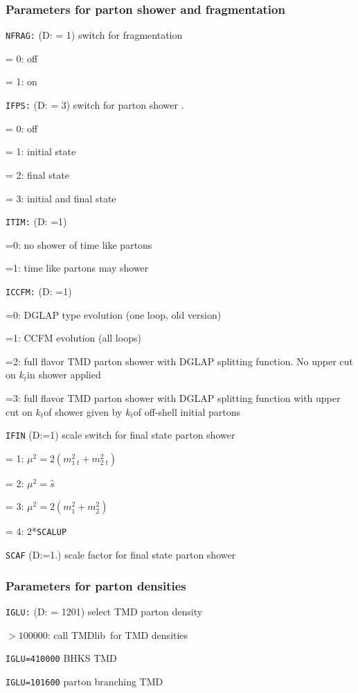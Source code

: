 \documentclass[11pt]{article} \usepackage{mystyle-new}
\newcommand{\deflab}[1]{#1\hfil}%
\newenvironment{defl}[1]%
  {\begin{list}{}{\settowidth{\labelwidth}{#1}%
  \setlength{\leftmargin}{\labelwidth}%
  \addtolength{\leftmargin}{\labelsep}%
  \setlength{\itemsep}{0pt plus 1pt}
  \setlength{\parsep}{0pt plus 1pt}
  \setlength{\topsep}{0pt plus 1pt}
  \setlength{\partopsep}{0pt plus 1pt}
  \setlength{\parskip}{2mm plus 1mm minus 1mm}
  \let\makelabel\deflab}}%
  {\end{list}}
\def\prp{t}
\newcommand{\kt}{k_{t}}
\def\kt{\ensuremath{k_{\prp}}}
\def\tmdlib{{\sc TMDlib}}
\begin{document}
\subsubsection{Parameters for parton shower and fragmentation}
\begin{defl}{123456789012345}
\item[{\tt NFRAG:}]  (D: = 1)
                        switch for fragmentation 
\item[] = 0: off
\item[] = 1: on 
\item[{\tt IFPS:}]  (D: = 3)
                  switch for parton shower .
\item[] = 0: off
\item[] = 1: initial state
\item[] = 2: final state
\item[] = 3: initial and final state  
\item[{\tt ITIM:}]  (D: =1)
\item[] =0: no shower of time like partons
\item[] =1: time like partons may shower
\item[{\tt ICCFM:}]  (D: =1)
\item[] =0: DGLAP type evolution (one loop, old version)
\item[] =1: CCFM evolution (all loops)
\item[] =2: full flavor TMD parton shower with DGLAP splitting function. No upper cut on \kt in shower applied
\item[] =3: full flavor TMD parton shower with DGLAP splitting function with upper cut on \kt of shower given by \kt of off-shell initial partons
\item[{\tt IFIN}]  (D:=1)  scale switch for  final state parton shower
\item[] = 1: $\mu^2=2 (m^2_{1\;t} + m^2_{2\;t})$
\item[] = 2: $\mu^2=\hat{s}$
\item[] = 3:  $\mu^2=2 (m^2_{1} + m^2_{2})$
\item[] = 4:  2*\verb+SCALUP+

\item[{\tt SCAF}] (D:=1.) scale factor for final state parton shower
\end{defl}

\subsubsection{Parameters for parton densities}
\label{sec:alphas}
\begin{defl}{123456789012345}
\item[{\tt IGLU:}]  (D: = 1201)
			select TMD parton density
\item[]   $> 100000$:  call \tmdlib\ for TMD densities
\item[]  \verb+IGLU=410000+ BHKS TMD \cite{Bury:2017jxo}
\item[]  \verb+IGLU=101600+ parton branching TMD \cite{Hautmann:2017fcj}
\end{defl}
\end{document}
